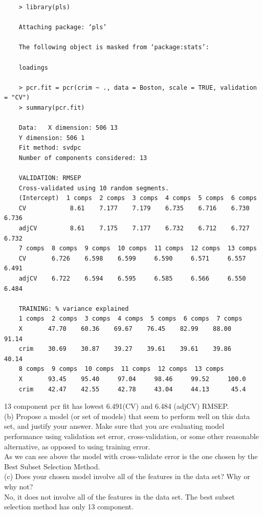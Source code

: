 \documentclass{article}
\begin{document}
\begin{program}
	\begin{verbatim}
	> library(pls)
	
	Attaching package: ‘pls’
	
	The following object is masked from ‘package:stats’:
	
	loadings
	
	> pcr.fit = pcr(crim ~ ., data = Boston, scale = TRUE, validation = "CV")
	> summary(pcr.fit)
	
	Data: 	X dimension: 506 13 
	Y dimension: 506 1
	Fit method: svdpc
	Number of components considered: 13
	
	VALIDATION: RMSEP
	Cross-validated using 10 random segments.
	(Intercept)  1 comps  2 comps  3 comps  4 comps  5 comps  6 comps
	CV            8.61    7.177    7.179    6.735    6.716    6.730    6.736
	adjCV         8.61    7.175    7.177    6.732    6.712    6.727    6.732
	7 comps  8 comps  9 comps  10 comps  11 comps  12 comps  13 comps
	CV       6.726    6.598    6.599     6.590     6.571     6.557     6.491
	adjCV    6.722    6.594    6.595     6.585     6.566     6.550     6.484
	
	TRAINING: % variance explained
	1 comps  2 comps  3 comps  4 comps  5 comps  6 comps  7 comps
	X       47.70    60.36    69.67    76.45    82.99    88.00    91.14
	crim    30.69    30.87    39.27    39.61    39.61    39.86    40.14
	8 comps  9 comps  10 comps  11 comps  12 comps  13 comps
	X       93.45    95.40     97.04     98.46     99.52     100.0
	crim    42.47    42.55     42.78     43.04     44.13      45.4	
	\end{verbatim}
\end{program}

13 component pcr fit has lowest 6.491(CV) and  6.484 (adjCV) RMSEP.\\






(b) Propose a model (or set of models) that seem to perform well on this data set, and justify your answer. Make sure that you are evaluating model performance using validation set error, cross-validation, or some other reasonable alternative, as opposed to using training error.\\

As we can see above the model with cross-validate error is the one chosen by the Best Subset Selection Method.\\


(c) Does your chosen model involve all of the features in the data set? Why or why not?\\

No, it does not involve all of the features in the data set. The best subset selection method has only 13 component.
\end{document}
